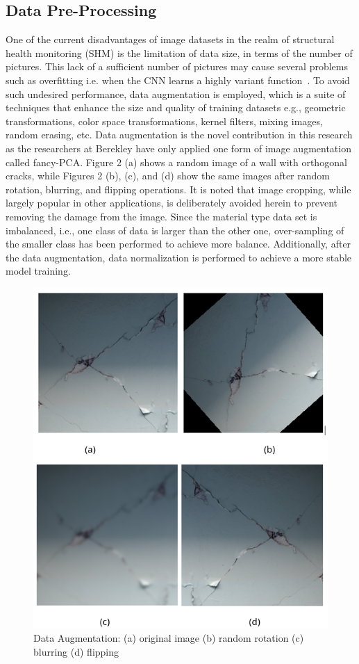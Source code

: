 \documentclass[10pt,twocolumn,letterpaper]{article}
\begin{document}
\subsection{Data Pre-Processing}
One of the current disadvantages of image datasets in the realm of structural health monitoring (SHM) is the limitation of data size, in terms of the number of pictures. This lack of a sufficient number of pictures may cause several problems such as overfitting i.e. when the CNN learns a highly variant function~\cite{Shorten01}. To avoid such undesired performance, data augmentation is employed, which is a suite of techniques that enhance the size and quality of training datasets e.g., geometric transformations, color space transformations, kernel filters, mixing images, random erasing, etc. Data augmentation is the novel contribution in this research as the researchers at Berekley have only applied one form of image augmentation called fancy-PCA. Figure 2 (a) shows a random image of a wall with orthogonal cracks, while Figures 2 (b), (c), and (d) show the same images after random rotation, blurring, and flipping operations. It is noted that image cropping, while largely popular in other applications, is deliberately avoided herein to prevent removing the damage from the image.
Since the material type data set is imbalanced, i.e., one class of data is larger than the other one, over-sampling of the smaller class has been performed to achieve more balance. Additionally, after the data augmentation, data normalization is performed to achieve a more stable model training.  

\begin{figure}[t]
\begin{center}
   \includegraphics[width=0.8\linewidth]{dataAug}
\end{center}
   \caption{Data Augmentation: (a) original image (b) random rotation (c) blurring (d) flipping ~\cite{Imagenet01}}
\label{fig:long2}
\end{figure}
\end{document}
